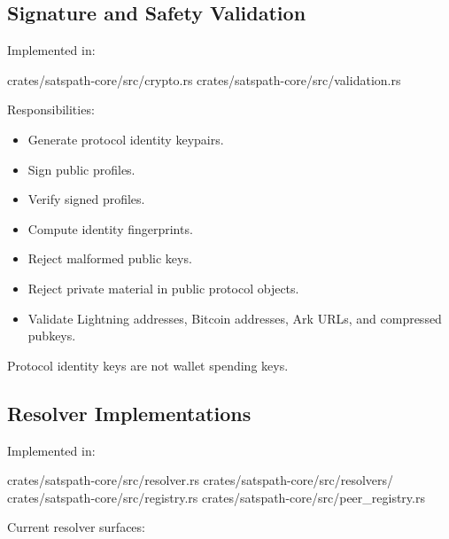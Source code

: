 \documentclass[
]{article}
\newenvironment{Shaded}{}{}
\newcommand{\NormalTok}[1]{#1}
\providecommand{\tightlist}{%
  \setlength{\itemsep}{0pt}\setlength{\parskip}{0pt}}
\begin{document}
\hypertarget{signature-and-safety-validation}{%
\subsection{Signature and Safety
Validation}\label{signature-and-safety-validation}}

Implemented in:

\begin{Shaded}
\begin{Highlighting}[]
\NormalTok{crates/satspath{-}core/src/crypto.rs}
\NormalTok{crates/satspath{-}core/src/validation.rs}
\end{Highlighting}
\end{Shaded}

Responsibilities:

\begin{itemize}
\tightlist
\item
  Generate protocol identity keypairs.
\item
  Sign public profiles.
\item
  Verify signed profiles.
\item
  Compute identity fingerprints.
\item
  Reject malformed public keys.
\item
  Reject private material in public protocol objects.
\item
  Validate Lightning addresses, Bitcoin addresses, Ark URLs, and
  compressed pubkeys.
\end{itemize}

Protocol identity keys are not wallet spending keys.

\hypertarget{resolver-implementations}{%
\subsection{Resolver Implementations}\label{resolver-implementations}}

Implemented in:

\begin{Shaded}
\begin{Highlighting}[]
\NormalTok{crates/satspath{-}core/src/resolver.rs}
\NormalTok{crates/satspath{-}core/src/resolvers/}
\NormalTok{crates/satspath{-}core/src/registry.rs}
\NormalTok{crates/satspath{-}core/src/peer\_registry.rs}
\end{Highlighting}
\end{Shaded}

Current resolver surfaces:
\end{document}
